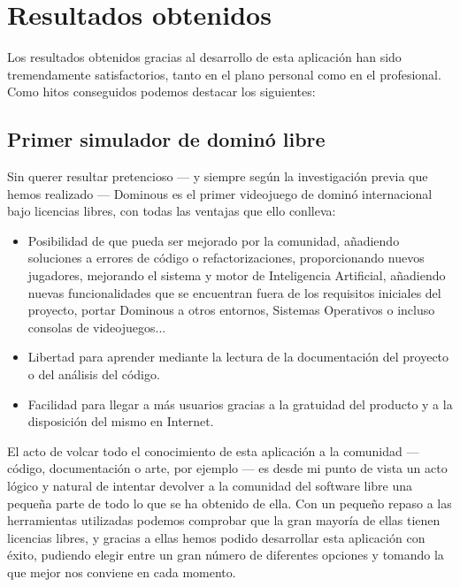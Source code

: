 

\section{Resultados obtenidos}

Los resultados obtenidos gracias al desarrollo de esta aplicación han sido tremendamente satisfactorios, tanto en el
plano personal como en el profesional. \\

Como hitos conseguidos podemos destacar los siguientes:

\subsection{Primer simulador de dominó libre}

Sin querer resultar pretencioso --- y siempre según la investigación previa que hemos realizado --- Dominous es el primer
videojuego de dominó internacional bajo licencias libres, con todas las ventajas que ello conlleva:

\begin{itemize}
    \item Posibilidad de que pueda ser mejorado por la comunidad, añadiendo soluciones a errores de código o refactorizaciones,
        proporcionando nuevos jugadores, mejorando el sistema y motor de Inteligencia Artificial, añadiendo nuevas
        funcionalidades que se encuentran fuera de los requisitos iniciales del proyecto, portar Dominous a otros
        entornos, Sistemas Operativos o incluso consolas de videojuegos...
    \item Libertad para aprender mediante la lectura de la documentación del proyecto o del análisis del código.
    \item Facilidad para llegar a más usuarios gracias a la gratuidad del producto y a la disposición del mismo
        en Internet.
\end{itemize}

El acto de volcar todo el conocimiento de esta aplicación a la comunidad --- código, documentación o arte, por ejemplo --- es desde
mi punto de vista un acto lógico y natural de intentar devolver a la comunidad del software libre una pequeña 
parte de todo lo que se ha obtenido de ella. Con un pequeño repaso a las herramientas utilizadas podemos comprobar
que la gran mayoría de ellas tienen licencias libres, y gracias a ellas hemos podido desarrollar esta aplicación con éxito,
pudiendo elegir entre un gran número de diferentes opciones y tomando la que mejor nos conviene en cada momento.


